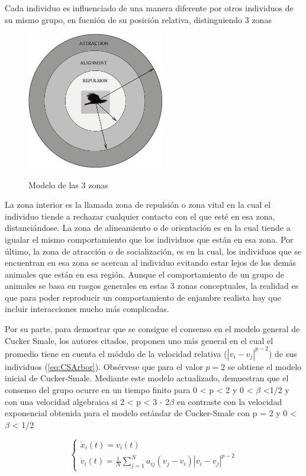 Cada individuo es influenciado de una manera diferente por otros individuos de su mismo grupo, en fucnión de su posición relativa, distinguiendo 3 zonas
\begin{figure}[h!]
    \centering
    {\includegraphics[height=6cm]{fig/cap03/3zones.png}}
    \caption{Modelo de las 3 zonas}
    \label{fig:3zonesModel}
\end{figure}

La zona interior es la llamada zona de repulsión o zona vital en la cual el individuo tiende a rechazar cualquier contacto con el que esté en esa zona, distanciándose. La zona de alineamiento o de orientación es en la cual tiende a igualar el mismo comportamiento que los individuos que están en esa zona. Por último, la zona de atracción o de socialización, es en la cual, los individuos que se encuentran en esa zona se acercan al individuo evitando estar lejos de los demás animales que están en esa región. Aunque el comportamiento de un grupo de animales se basa en rasgos generales en estas 3 zonas conceptuales, la realidad es que para poder reproducir un comportamiento de enjambre realista hay que incluir interacciones mucho más complicadas.

Por su parte, para demostrar que se consigue el consenso en el modelo general de Cucker Smale, los autores citados, proponen uno más general en el cual el promedio tiene en cuenta el módulo de la velocidad relativa ($ |v_{i}-v_{j}|^{p-2} $) de sus individuos (\ref{eq:CSArbor}). Obsérvese que para el valor $p = 2$ se obtiene el modelo inicial de Cucker-Smale. Mediante este modelo actualizado, demuestran que el consenso del grupo ocurre en un tiempo finito para 0 < p < 2 y 0 < $\beta$ <1/2 y con una velocidad algebraica si 2 < p < 3 - 2$\beta$ en contraste con la velocidad exponencial obtenida para el modelo estándar de Cucker-Smale con p = 2 y 0 < $\beta$ < 1/2


\begin{equation}\label{eq:CSArbor} 
    \left\lbrace
    \begin{array}{l}
        \dot{x}_{i}(t)=v_{i}(t) \\
        \dot{v}_{i}(t)= \displaystyle{\frac{1}{N}\sum_{j=1}^{N}a_{ij}(v_{j}-v_{i})|v_{i}-v_{j}|^{p-2}}
    \end{array}
    \right.
\end{equation}

